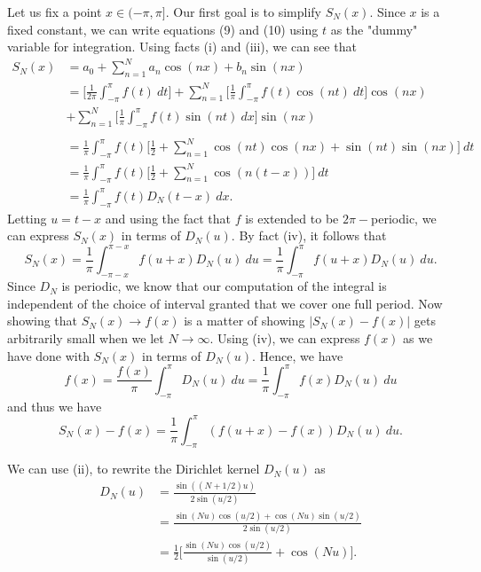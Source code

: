 Let us fix a point \( x \in  (- \pi , \pi] \). Our first goal is to simplify \( S_{N}(x)  \). Since \( x  \) is a fixed constant, we can write equations (9) and (10) using \( t  \) as the "dummy" variable for integration. Using facts (i) and (iii), we can see that 
\begin{align*}
    S_{N}(x) &= a_{0 } + \sum_{ n=1  }^{ N  }a_{n} \cos(nx) + b_{n} \sin(nx) \\
             &=  \Big[ \frac{ 1 }{  2 \pi  } \int_{ -\pi  }^{ \pi  } f(t)  \ dt \Big] + \sum_{ n=1  }^{ N  } \Big[\frac{ 1 }{ \pi  } \int_{ -\pi  }^{ \pi  } f(t) \cos(nt)  \ dt \Big] \cos(nx)  \\
             &+ \sum_{ n=1  }^{ N  } \Big[ \frac{ 1 }{ \pi  } \int_{ - \pi  }^{ \pi  } f(t) \sin(nt) \ dx  \Big] \sin(nx) \\ \\
             &= \frac{ 1 }{ \pi  } \int_{ - \pi  }^{ \pi  } f(t) \Big[ \frac{ 1 }{ 2 }  + \sum_{ n=1  }^{ N  } \cos(nt) \cos(nx) + \sin(nt) \sin(nx) \Big] \ dt  \\
             &= \frac{ 1 }{ \pi  } \int_{ -\pi  }^{ \pi  } f(t) \Big[\frac{ 1 }{ 2 } + \sum_{ n =1  }^{ N  } \cos(n( t - x)) \Big] \ dt \\
             &= \frac{ 1 }{ \pi  } \int_{ -\pi  }^{ \pi  } f(t) D_{N}(t-x) \ dx.
\end{align*}
Letting \( u = t - x  \) and using the fact that \( f  \) is extended to be \( 2 \pi-\)periodic, we can express \( S_{N}(x)  \) in terms of \( D_{N}(u)  \). By fact (iv), it follows that
\[  S_{N}(x) = \frac{ 1 }{ \pi  } \int_{ -\pi - x  }^{ \pi - x  } f(u+x) D_{N}(u) \ du = \frac{ 1 }{ \pi  } \int_{ -\pi  }^{ \pi  } f(u+x) D_{N}(u)  \ du. \]
Since \( D_{N} \) is periodic, we know that our computation of the integral is independent of the choice of interval granted that we cover one full period.
    Now showing that \( S_{N}(x) \to f(x)  \) is a matter of showing \( | S_{N}(x) - f(x)  |  \) gets arbitrarily small when we let \( N \to \infty  \). Using (iv), we can express \( f(x)  \) as we have done with \( S_{N}(x)  \) in terms of \( D_{N}(u)  \). Hence, we have
    \[  f(x) = \frac{ f(x)  }{ \pi  } \int_{ -\pi  }^{ \pi  } D_{N}(u)  \ du = \frac{ 1 }{ \pi  } \int_{ - \pi  }^{ \pi  } f(x) D_{N}(u)  \ du \] and thus we have 
    \[  S_{N}(x) - f(x) = \frac{ 1 }{ \pi  } \int_{ -\pi  }^{ \pi  } (f(u+x) - f(x)) D_{N}(u) \ du. \tag{11} \]

We can use (ii), to rewrite the Dirichlet kernel \( D_{N}(u)  \) as 
\begin{align*}
    D_{N}(u) &= \frac{ \sin((N+1/2)u) }{ 2 \sin(u/2) }   \\
             &= \frac{ \sin(Nu) \cos(u/2) + \cos(Nu) \sin(u/2) }{ 2 \sin(u/2) } \\
             &= \frac{ 1 }{ 2 } \Big[ \frac{ \sin(Nu) \cos(u/2) }{ \sin(u/2) } + \cos(Nu)\Big]. \\
\end{align*}

